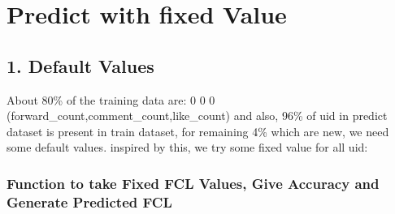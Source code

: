 \documentclass[11pt]{article}
\begin{document}
    \section{Predict with fixed Value}\label{predict-with-fixed-value}

\subsection{1. Default Values}\label{default-values}

About 80\% of the training data are: 0 0 0
(forward\_count,comment\_count,like\_count) and also, 96\% of uid in
predict dataset is present in train dataset, for remaining 4\% which are
new, we need some default values. inspired by this, we try some fixed
value for all uid:

    \subsubsection{Function to take Fixed FCL Values, Give Accuracy and
Generate Predicted
FCL}\label{function-to-take-fixed-fcl-values-give-accuracy-and-generate-predicted-fcl}
\end{document}
